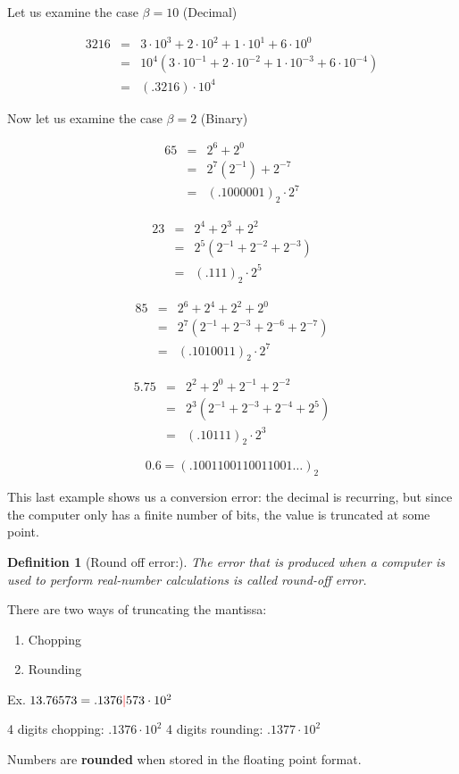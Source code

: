 \documentclass[]{article}
\newtheorem{Def}{Definition}
\begin{document}
Let us examine the case $ \beta = 10 $ (Decimal)

\begin{eqnarray*}
	3216 &=& 3\cdot10^3 + 2\cdot10^2 + 1\cdot10^1 + 6\cdot10^0\\
	&=& 10^4(3\cdot10^{-1} + 2\cdot10^{-2} + 1\cdot10^{-3} + 6\cdot10^{-4}) \\
	&=& (.3216)\cdot10^4 
\end{eqnarray*}



Now let us examine the case $ \beta = 2 $ (Binary)

\begin{eqnarray*}
65 &=& 2^6 + 2^0 \\
      &=& 2^7(2^{-1}) + 2^{-7} \\
 &=&(.1000001)_2 \cdot 2^7 
\end{eqnarray*}

\begin{eqnarray*}
	23 &=& 2^4 + 2^3 + 2^2 \\
	&=& 2^5(2^{-1} + 2^{-2} + 2^{-3}) \\
	&=& (.111)_2 \cdot 2^5
\end{eqnarray*}

\begin{eqnarray*}
	  85 &=& 2^6 + 2^4 + 2^2 + 2^0 \\
	&=& 2^7(2^{-1} + 2^{-3} + 2^{-6} + 2^{-7}) \\
	&=& (.1010011)_2 \cdot 2^7 
\end{eqnarray*}

\begin{eqnarray*}
	5.75 &=& 2^2 + 2^0 + 2^{-1} + 2^{-2} \\
	&=& 2^3(2^{-1} + 2^{-3} + 2^{-4} + 2^{5}) \\
	&=& (.10111)_2 \cdot 2^3 
\end{eqnarray*}




\[ 0.6 = (.1001100110011001\ldots)_2 \]

This last example shows us a conversion error: the decimal is recurring, but since the computer only has a finite number of bits, the value is truncated at some point.

\begin{Def}[Round off error:]
The error that is produced when a computer is used to perform real-number calculations is called round-off error.
\end{Def}

There are two ways of truncating the mantissa:

\begin{enumerate}
	\item Chopping
	\item Rounding 
\end{enumerate}

Ex. $ 13.76573 = .1376 {\bf{\color{red} |}} 573 \cdot 10^2 $

4 digits chopping: $ .1376 \cdot 10^2 $
4 digits rounding: $ .1377 \cdot 10^2 $

Numbers are \textbf{rounded} when stored in the floating point format.
\end{document}
